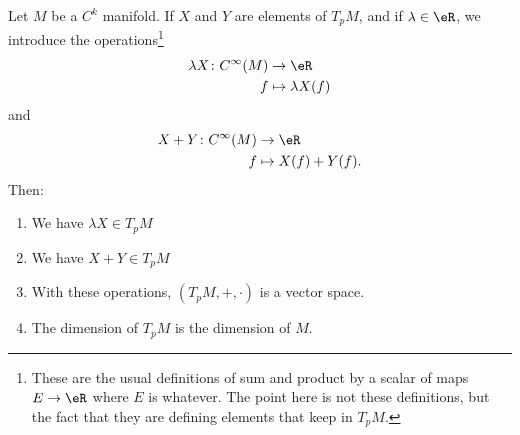 \begin{propositionDef}		\label{PROPooEJBWooSbvypo}
	Let \( M\) be a \( C^k\) manifold. If \( X\) and \( Y \) are elements of \( T_pM\), and if \( \lambda\in \eR\), we introduce the operations\footnote{These are the usual definitions of sum and product by a scalar of maps \( E\to \eR\) where \( E\) is whatever. The point here is not these definitions, but the fact that they are defining elements that keep in \( T_pM\).}
	\begin{equation}
		\begin{aligned}
			\lambda X\colon  C^{\infty}(M) & \to \eR              \\
			f                              & \mapsto \lambda X(f)
		\end{aligned}
	\end{equation}
	and
	\begin{equation}
		\begin{aligned}
			X+Y\colon  C^{\infty}(M) & \to \eR            \\
			f                        & \mapsto X(f)+Y(f).
		\end{aligned}
	\end{equation}
	Then:
	\begin{enumerate}
		\item
		      We have \( \lambda X\in T_pM\)
		\item
		      We have \( X+Y\in T_pM\)
		\item		\label{ITEMooDRUQooWrsaDd}
		      With these operations, \( (T_pM,+,\cdot)\) is a vector space.
		\item		\label{ITEMooJEYEooLuJiqz}
		      The dimension of \( T_pM\) is the dimension of \( M\).
	\end{enumerate}
\end{propositionDef}


